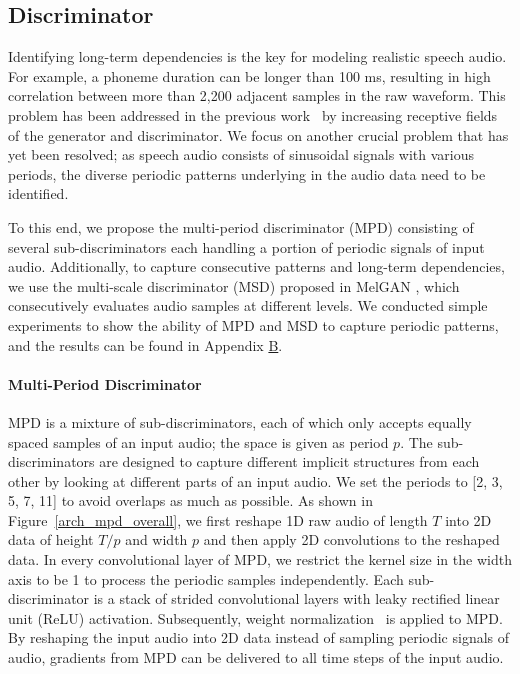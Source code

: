 \subsection{Discriminator}

Identifying long-term dependencies is the key for modeling realistic speech audio. For example, a phoneme duration can be longer than 100 ms, resulting in high correlation between more than 2,200 adjacent samples in the raw waveform. This problem has been addressed in the previous work~\citep{donahue2018adversarial} by increasing receptive fields of the generator and discriminator. We focus on another crucial problem that has yet been resolved; as speech audio consists of sinusoidal signals with various periods, the diverse periodic patterns underlying in the audio data need to be identified.

To this end, we propose the multi-period discriminator (MPD) consisting of several sub-discriminators each handling a portion of periodic signals of input audio. Additionally, to capture consecutive patterns and long-term dependencies, we use the multi-scale discriminator (MSD) proposed in MelGAN \citep{Kumar2018melgan}, which consecutively evaluates audio samples at different levels.
We conducted simple experiments to show the ability of MPD and MSD to capture periodic patterns, and the results can be found in Appendix \hyperref[app-b1]{B}.

\paragraph{Multi-Period Discriminator} MPD is a mixture of sub-discriminators, each of which only accepts equally spaced samples of an input audio; the space is given as period $p$. The sub-discriminators are designed to capture different implicit structures from each other by looking at different parts of an input audio. We set the periods to [2, 3, 5, 7, 11] to avoid overlaps as much as possible.
As shown in Figure~\ref{arch_mpd_overall}, we first reshape 1D raw audio of length $T$ into 2D data of height $T/p$ and width $p$ and then apply 2D convolutions to the reshaped data. In every convolutional layer of MPD, we restrict the kernel size in the width axis to be 1 to process the periodic samples independently. Each sub-discriminator is a stack of strided convolutional layers with leaky rectified linear unit (ReLU) activation. Subsequently, weight normalization~\citep{salimans2016weight} is applied to MPD.
By reshaping the input audio into 2D data instead of sampling periodic signals of audio, gradients from MPD can be delivered to all time steps of the input audio.

